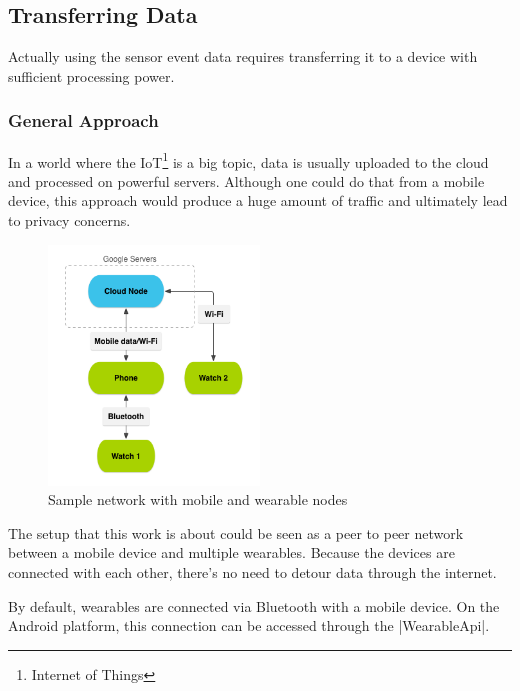 \clearpage

\subsection{Transferring Data}
\label{sec:implementation:transferringdata}
Actually using the sensor event data requires transferring it to a device with sufficient processing power.

\subsubsection{General Approach}
In a world where the IoT\footnote{Internet of Things} is a big topic, data is usually uploaded to the cloud and processed on powerful servers.
Although one could do that from a mobile device, this approach would produce a huge amount of traffic and ultimately lead to privacy concerns.

\begin{figure}[H]
	\centering
	\includegraphics[width=0.5\textwidth]{images/wear_cloud_node.png}
	\caption[Caption for wear_cloud_node]{Sample network with mobile and wearable nodes\footnotemark}
	\label{fig:nodeNetwork}
\end{figure}

The setup that this work is about could be seen as a peer to peer network between a mobile device and multiple wearables.
Because the devices are connected with each other, there's no need to detour data through the internet.

\clearpage

By default, wearables are connected via Bluetooth with a mobile device.
On the Android platform, this connection can be accessed through the |WearableApi|\cite{androiddocs:wearable}.

